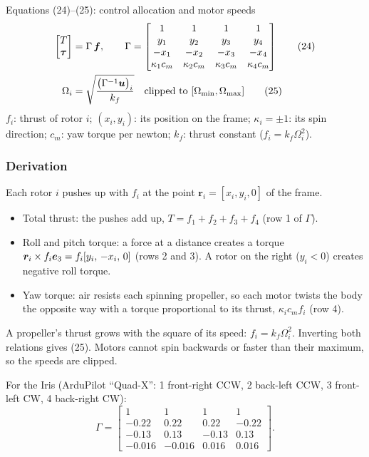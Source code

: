 \begin{eqbox}{Equations (24)--(25): control allocation and motor speeds}
\begin{align}
  \begin{bmatrix}T\\ \bm{\tau}\end{bmatrix}&=\Gamma\,\bm{f},\qquad
  \Gamma=\begin{bmatrix}1&1&1&1\\ y_1&y_2&y_3&y_4\\ -x_1&-x_2&-x_3&-x_4\\ \kappa_1c_m&\kappa_2c_m&\kappa_3c_m&\kappa_4c_m\end{bmatrix} \tag{24}\label{eq:24}\\
  \Omega_i&=\sqrt{\frac{\big(\Gamma^{-1}\bm{u}\big)_i}{k_f}}\quad\text{clipped to }[\Omega_{\min},\Omega_{\max}] \tag{25}\label{eq:25}
\end{align}
$f_i$: thrust of rotor $i$; $(x_i,y_i)$: its position on the frame; $\kappa_i=\pm1$: its spin direction; $c_m$: yaw torque per newton;
$k_f$: thrust constant ($f_i=k_f\Omega_i^2$).
\end{eqbox}

\subsubsection*{Derivation}
Each rotor $i$ pushes up with $f_i$ at the point $\bm r_i=[x_i,y_i,0]$ of the frame.
\begin{itemize}
  \item Total thrust: the pushes add up, $T=f_1+f_2+f_3+f_4$ (row 1 of $\Gamma$).
  \item Roll and pitch torque: a force at a distance creates a torque $\bm r_i\times f_i\bm{e}_3=f_i[y_i,\,-x_i,\,0]$
        (rows 2 and 3). A rotor on the right ($y_i<0$) creates negative roll torque.
  \item Yaw torque: air resists each spinning propeller, so each motor twists the body the opposite way with a torque
        proportional to its thrust, $\kappa_ic_mf_i$ (row 4).
\end{itemize}
A propeller's thrust grows with the square of its speed: $f_i=k_f\Omega_i^2$. Inverting both relations gives (25).
Motors cannot spin backwards or faster than their maximum, so the speeds are clipped.

For the Iris (ArduPilot ``Quad-X'': 1 front-right CCW, 2 back-left CCW, 3 front-left CW, 4 back-right CW):
\[
\Gamma=\begin{bmatrix}1&1&1&1\\-0.22&0.22&0.22&-0.22\\-0.13&0.13&-0.13&0.13\\-0.016&-0.016&0.016&0.016\end{bmatrix}.
\]

